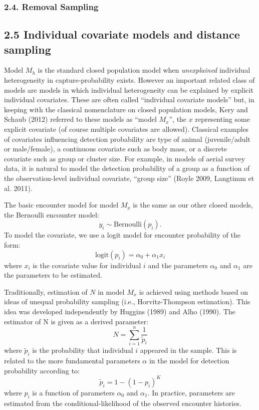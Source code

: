 \documentclass{book}
\begin{document}
\subsubsection*{2.4. Removal Sampling}


\subsection*{2.5 Individual covariate models and distance sampling}

Model $M_h$ is the standard closed population model when {\it
  unexplained} individual heterogeneity in capture-probability
exists. However an important related class of models are models in
which individual heterogeneity can be explained by explicit individual
covariates. These are often called ``individual covariate models''
but, in keeping with the classical nomenclature on closed population
models, Kery and Schaub (2012) referred to these models as ``model
$M_{x}$'', the $x$ representing some explicit covariate (of course
multiple covariates are allowed).  Classical examples of covariates
influencing detection probability are type of animal (juvenile/adult
or male/female), a continuous covariate such as body mass, or a
discrete covariate such as group or cluster size. For example, in
models of aerial survey data, it is natural to model the detection
probability of a group as a function of the observation-level
individual covariate, ``group size'' (Royle 2009, Langtimm et
al. 2011).

The basic encounter model for model $M_x$ is the same as our other
closed models, the Bernoulli encounter model:
\[
y_{i} \sim \mbox{Bernoulli}(p_{i}).
\]
To model the covariate, we use a logit model for encounter probability
of the form:
\begin{equation}
 \mbox{logit}(p_{i}) = \alpha_0 + \alpha_1 x_{i}
\end{equation}
where $x_i$ is the covariate value for individual $i$ and the
parameters $\alpha_0$ and $\alpha_1$ are the parameters to be
estimated.

Traditionally, estimation of $N$ in model $M_{x}$ is
achieved using methods based on ideas of unequal probability sampling
(i.e., Horvitz-Thompson estimation). This idea was developed
independently by Huggins (1989) and Alho (1990). The estimator of N is
given as a derived parameter:
\[
\hat{N} = \sum_{i=1}^{n} \frac{1}{\tilde{p}_{i}}
\]
where $\tilde{p}_{i}$ is the probability that individual $i$ appeared
in the sample.   This is related to the more fundamental parameters
$\alpha$ in the model for detection probability according to:
\[
\tilde{p}_{i}  = 1- (1-p_{i})^K
\]
where $p_{i}$ is a function of parameters $\alpha_{0}$ and $\alpha_{1}$.
In practice, parameters are
estimated from the conditional-likelihood of the observed encounter
histories.
\end{document}
